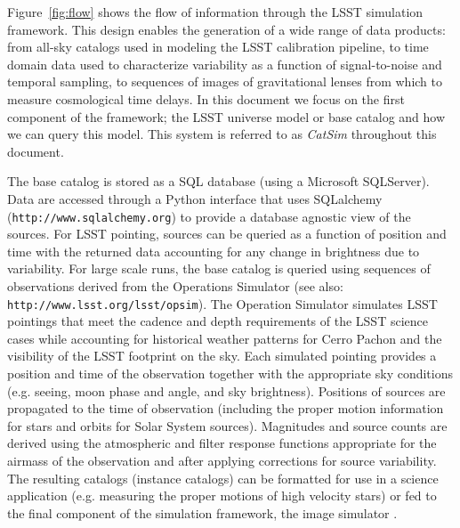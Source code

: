\documentclass[11pt]{article}
\begin{document}
Figure~\ref{fig:flow} shows the flow of information through the LSST
simulation framework.
This design enables the generation of a wide range of data products:
from all-sky catalogs used in modeling the LSST calibration pipeline,
to time domain data used to characterize variability as a function of
signal-to-noise and temporal sampling, to sequences of images of
gravitational lenses from which to measure cosmological time delays.
In this document we focus on the first component of the framework; the
LSST universe model or base catalog and how we can query this
model. This system is referred to as {\it CatSim} throughout this
document.

The base catalog is stored as a SQL database (using a Microsoft
SQLServer). Data are accessed through a Python interface that uses
SQLalchemy ({\tt http://www.sqlalchemy.org}) to provide a database
agnostic view of the sources. For LSST pointing, sources can be
queried as a function of position and time with the returned data
accounting for any change in brightness due to variability. For large
scale runs, the base catalog is queried using sequences of
observations derived from the Operations Simulator \citep{cook09} (see
also: {\tt http://www.lsst.org/lsst/opsim}).  The Operation Simulator
simulates LSST pointings that meet the cadence and depth requirements
of the LSST science cases while accounting for historical weather
patterns for Cerro Pachon and the visibility of the LSST footprint on
the sky. Each simulated pointing provides a position and time of the
observation together with the appropriate sky conditions (e.g. seeing,
moon phase and angle, and sky brightness). Positions of sources are
propagated to the time of observation (including the proper motion
information for stars and orbits for Solar System sources). Magnitudes
and source counts are derived using the atmospheric and filter
response functions appropriate for the airmass of the observation and
after applying corrections for source variability. The resulting
catalogs (instance catalogs) can be formatted for use in a science
application (e.g. measuring the proper motions of high velocity stars)
or fed to the final component of the simulation framework, the image
simulator \citep{phosim}.
\end{document}
